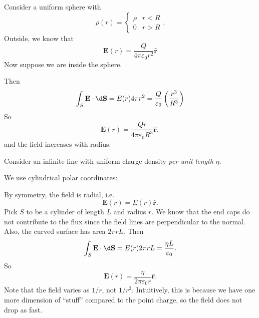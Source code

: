 \documentclass[a4paper]{article}
\begin{document}
\begin{eg}
  Consider a uniform sphere with
  \[
    \rho (r) = \begin{cases}
      \rho & r < R\\
      0 & r > R
    \end{cases}.
  \]
  Outside, we know that
  \[
    \mathbf{E}(r) = \frac{Q}{4\pi\varepsilon_0 r^2}\hat{\mathbf{r}}
  \]
  Now suppose we are inside the sphere.
  \begin{center}
  \end{center}
  Then
  \[
    \int_S \mathbf{E}\cdot \d\mathbf{S} = E(r) 4\pi r^2 = \frac{Q}{\varepsilon_0}\left(\frac{r^3}{R^3}\right)
  \]
  So
  \[
    \mathbf{E}(r) = \frac{Qr}{4\pi\varepsilon_0 R^3}\hat{\mathbf{r}},
  \]
  and the field increases with radius.
\end{eg}

\begin{eg}
  Consider an infinite line with uniform charge density \emph{per unit length} $\eta$.

  We use cylindrical polar coordinates:
  \begin{center}
  \end{center}
  By symmetry, the field is radial, i.e.
  \[
    \mathbf{E}(r) = E(r) \hat{\mathbf{r}}.
  \]
  Pick $S$ to be a cylinder of length $L$ and radius $r$. We know that the end caps do not contribute to the flux since the field lines are perpendicular to the normal. Also, the curved surface has area $2\pi rL$. Then
  \[
    \int_S\mathbf{E}\cdot \d\mathbf{S} = E(r)2\pi rL = \frac{\eta L}{\varepsilon_0}.
  \]
  So
  \[
    \mathbf{E}(r) = \frac{\eta}{2\pi \varepsilon_0 r} \hat{\mathbf{r}}.
  \]
  Note that the field varies as $1/r$, not $1/r^2$. Intuitively, this is because we have one more dimension of ``stuff'' compared to the point charge, so the field does not drop as fast.
\end{eg}
\end{document}
